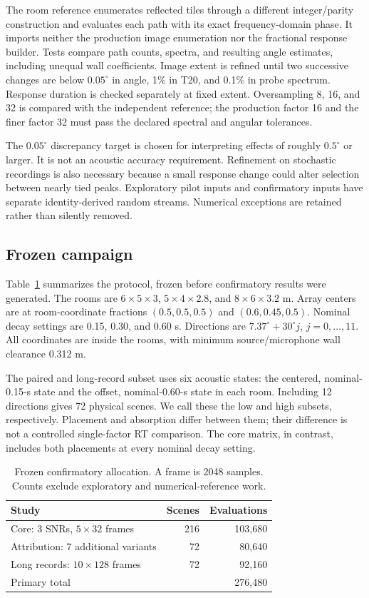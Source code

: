 \documentclass[10pt,a4paper,twocolumn]{article}
\begin{document}
The room reference enumerates reflected tiles through a different integer/parity construction and evaluates each path with its exact frequency-domain phase. It imports neither the production image enumeration nor the fractional response builder. Tests compare path counts, spectra, and resulting angle estimates, including unequal wall coefficients. Image extent is refined until two successive changes are below $0.05^\circ$ in angle, 1\% in T20, and 0.1\% in probe spectrum. Response duration is checked separately at fixed extent. Oversampling 8, 16, and 32 is compared with the independent reference; the production factor 16 and the finer factor 32 must pass the declared spectral and angular tolerances.

The $0.05^\circ$ discrepancy target is chosen for interpreting effects of roughly $0.5^\circ$ or larger. It is not an acoustic accuracy requirement. Refinement on stochastic recordings is also necessary because a small response change could alter selection between nearly tied peaks. Exploratory pilot inputs and confirmatory inputs have separate identity-derived random streams. Numerical exceptions are retained rather than silently removed.

\subsection{Frozen campaign}
Table~\ref{tab:protocol} summarizes the protocol, frozen before confirmatory results were generated. The rooms are $6\times5\times3$, $5\times4\times2.8$, and $8\times6\times3.2$ m. Array centers are at room-coordinate fractions $(0.5,0.5,0.5)$ and $(0.6,0.45,0.5)$. Nominal decay settings are 0.15, 0.30, and 0.60 s. Directions are $7.37^\circ+30^\circ j$, $j=0,\ldots,11$. All coordinates are inside the rooms, with minimum source/microphone wall clearance 0.312 m.

The paired and long-record subset uses six acoustic states: the centered, nominal-0.15-s state and the offset, nominal-0.60-s state in each room. Including 12 directions gives 72 physical scenes. We call these the low and high subsets, respectively. Placement and absorption differ between them; their difference is not a controlled single-factor RT comparison. The core matrix, in contrast, includes both placements at every nominal decay setting.

\begin{table}[t]
\centering\small
\caption{Frozen confirmatory allocation. A frame is 2048 samples. Counts exclude exploratory and numerical-reference work.}
\label{tab:protocol}
\begin{tabular}{@{}lrr@{}}\toprule
Study & Scenes & Evaluations\\\midrule
Core: 3 SNRs, $5\times32$ frames & 216 & 103,680\\
Attribution: 7 additional variants & 72 & 80,640\\
Long records: $10\times128$ frames & 72 & 92,160\\\midrule
Primary total & & 276,480\\\bottomrule
\end{tabular}
\end{table}
\end{document}
